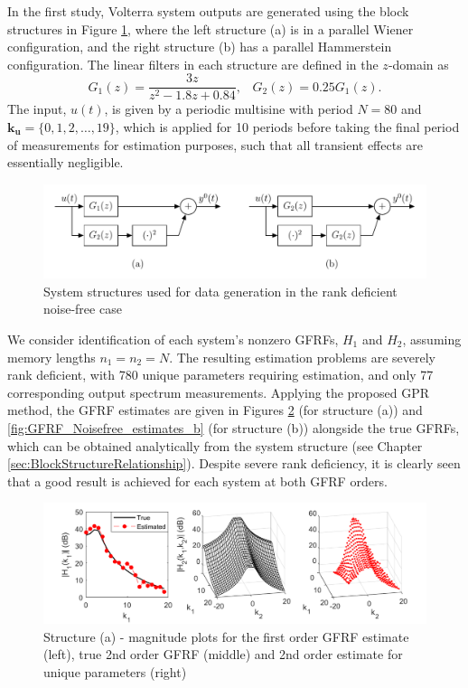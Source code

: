 In the first study, Volterra system outputs are generated using the block structures in Figure \ref{fig:GFRF_WienerStructure}, where the left structure (a) is in a parallel Wiener configuration, and the right structure (b) has a parallel Hammerstein configuration. The linear filters in each structure are defined in the $z$-domain as
$$G_1(z) = \frac{3z}{z^2 -1.8z + 0.84}, \; \; \;  G_2(z) = 0.25 G_1(z).$$
The input, $u(t)$, is given by a periodic multisine with period $N = 80$ and $\mathbf{k_u} = \{0, 1, 2, \hdots, 19\}$, which is applied for 10 periods before taking the final period of measurements for estimation purposes, such that all transient effects are essentially negligible. 

\begin{figure}[!h]
\centering
\includegraphics[width = 1\textwidth]{Chapter8_GFRFs/ParallelWienerAndHamm_GFRFs.pdf}
\caption{System structures used for data generation in the rank deficient noise-free case}
\label{fig:GFRF_WienerStructure}
\end{figure}

We consider identification of each system's nonzero GFRFs, $H_1$ and $H_2$, assuming memory lengths $n_1=n_2=N$. The resulting estimation problems are severely rank deficient, with 780 unique parameters requiring estimation, and only 77 corresponding output spectrum measurements. Applying the proposed GPR method, the GFRF estimates are given in Figures \ref{fig:GFRF_Noisefree_estimates} (for structure (a)) and \ref{fig:GFRF_Noisefree_estimates_b} (for structure (b)) alongside the true GFRFs, which can be obtained analytically from the system structure (see Chapter \ref{sec:BlockStructureRelationship}). Despite severe rank deficiency, it is clearly seen that a good result is achieved for each system at both GFRF orders.  

\begin{figure}[!h]
\centering
\includegraphics[width = 1.05\textwidth]{Chapter8_GFRFs/WienerExampleEstimates_split2.pdf}
\caption{Structure (a) - magnitude plots for the first order GFRF estimate (left), true 2nd order GFRF (middle) and 2nd order estimate for unique parameters (right)}
\label{fig:GFRF_Noisefree_estimates}
\end{figure}

